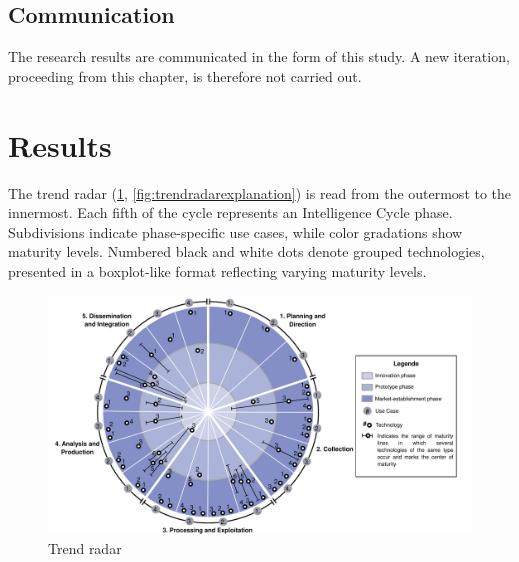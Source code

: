 \documentclass[10pt]{article}
\begin{document}
\subsection{Communication}

The research results are communicated in the form of this study.
A new iteration, proceeding from this chapter, is therefore not
carried out.

\section{Results} \label{sec:results}

The trend radar (\ref{fig:trendradar}, \ref{fig:trendradarexplanation}) is read from the outermost to the innermost.
Each fifth of the cycle represents an Intelligence Cycle phase. Subdivisions indicate
phase-specific use cases, while color gradations show maturity levels. Numbered black
and white dots denote grouped technologies, presented in a boxplot-like format reflecting
varying maturity levels.

\begin{figure}[thb]
    \centering
    \includegraphics[width=\textwidth]{PDF/images/crop_Trendradar}
    \caption{Trend radar}
    \label{fig:trendradar}
\end{figure}

\begin{figure}[!thb]
    \centering
\end{figure}
\end{document}
